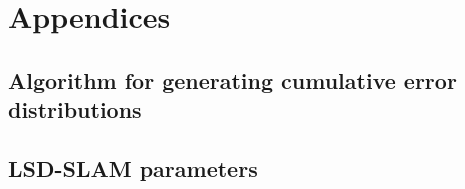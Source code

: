 \chapter{Appendices}

\section{Algorithm for generating cumulative error distributions}


\newpage



\newpage
\section{LSD-SLAM parameters}
\label{sec:slampars}

